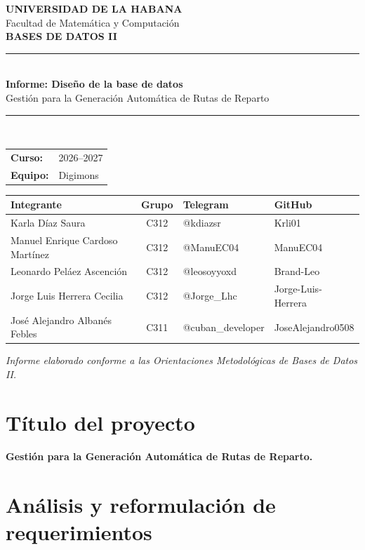 \documentclass[12pt,a4paper]{article}
\begin{document}
\begin{titlepage}
\thispagestyle{empty}
\begin{center}
\vspace*{1cm}
{\Large \textbf{UNIVERSIDAD DE LA HABANA}}\\[0.35cm]
{\large Facultad de Matemática y Computación}\\[1.6cm]
{\Large \textbf{BASES DE DATOS II}}\\[1.5cm]
{\rule{\textwidth}{1pt}}\\[0.5cm]
{\huge \textbf{Informe: Diseño de la base de datos}}\\[0.45cm]
{\Large Gestión para la Generación Automática de Rutas de Reparto}\\[0.5cm]
{\rule{\textwidth}{1pt}}\\[2cm]
\begin{tabular}{ll}
\textbf{Curso:} & 2026--2027 \\
\textbf{Equipo:} & Digimons
\end{tabular}
\vfill
\begin{tabular}{>{\raggedright\arraybackslash}p{6.6cm}c p{3.1cm} p{3.7cm}}
\toprule
\textbf{Integrante} & \textbf{Grupo} & \textbf{Telegram} & \textbf{GitHub}\\
\midrule
Karla Díaz Saura & C312 & @kdiazsr & Krli01\\
Manuel Enrique Cardoso Martínez & C312 & @ManuEC04 & ManuEC04\\
Leonardo Peláez Ascención & C312 & @leosoyyoxd & Brand-Leo\\
Jorge Luis Herrera Cecilia & C312 & @Jorge\_Lhc & Jorge-Luis-Herrera\\
José Alejandro Albanés Febles & C311 & @cuban\_developer & JoseAlejandro0508\\
\bottomrule
\end{tabular}
\vfill
\textit{Informe elaborado conforme a las Orientaciones Metodológicas de Bases de Datos II.}
\end{center}
\end{titlepage}

\tableofcontents
\newpage

\section{Título del proyecto}
\textbf{Gestión para la Generación Automática de Rutas de Reparto.}

\section{Análisis y reformulación de requerimientos}
\end{document}
